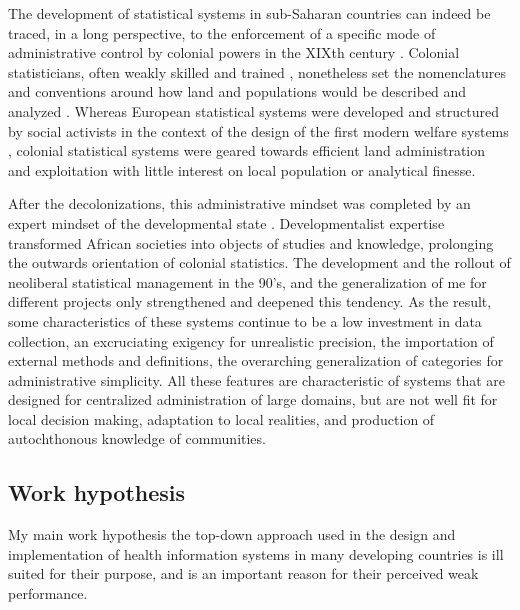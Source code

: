 The development of statistical systems in sub-Saharan countries can indeed  be traced, in a long perspective, to the enforcement of  a specific mode of administrative control by colonial powers in the XIXth century \citep{appadurai_number_1996,cordell_couting_2010,gervais_how_2010}.
Colonial statisticians, often weakly skilled and trained \citep{kateb_gestion_1998,cordell_couting_2010}, nonetheless set the nomenclatures and conventions around how land and populations would be described and analyzed \citep{rambert_cartographie_1922,gervais_how_2010}.
Whereas European statistical systems were developed and structured by social activists in the context of the design of the first modern welfare systems \citep{desrosieres_politique_1993,desrosieres_administrator_1997}, colonial statistical systems were geared towards efficient land administration and exploitation \citep{rambert_cartographie_1922,de_martonne_cartographie_1931} with little interest on local population or analytical finesse.

After the decolonizations, this administrative mindset was completed by an expert mindset of the developmental state \citep{bonneuil_development_2000}. Developmentalist expertise transformed African societies into objects of studies and knowledge, prolonging the outwards orientation of colonial statistics. The development and the rollout of neoliberal statistical management in the 90's, and the generalization of \gls{me} for different projects \citep{desrosieres_prouver_2014} only strengthened and deepened this tendency. As the result, some characteristics of these systems continue to be a low investment in data collection, an excruciating exigency for unrealistic precision, the importation of external methods and definitions, the overarching generalization of categories for administrative simplicity. All these features are characteristic of systems that are designed for centralized administration of large domains, but are not well fit for local decision making, adaptation to local realities, and production of autochthonous knowledge of communities.

\subsection{Work hypothesis}

My main work hypothesis the top-down approach used in the design and implementation of health information systems in many developing countries is ill suited for their purpose, and is an important reason for their perceived weak performance.

